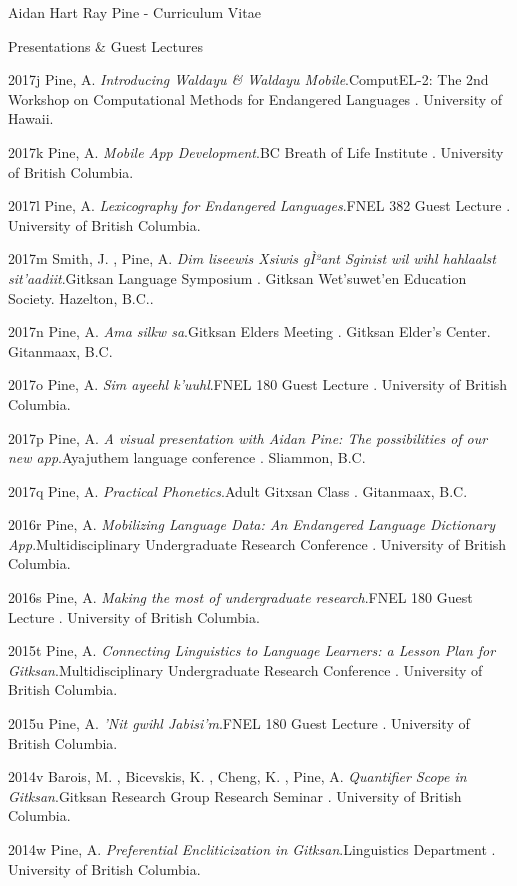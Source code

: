 \documentclass[12pt]{letter}
\begin{document}
\begin{cv}{ Aidan Hart Ray Pine  \space - \space   Curriculum Vitae}
\begin{cvlist}{Presentations \& Guest Lectures}
                    \item[2017j]  Pine,  A.   \textit{Introducing Waldayu \& Waldayu Mobile}.ComputEL-2: The 2nd Workshop on Computational Methods for Endangered Languages . University of Hawaii.  
                    \item[2017k]  Pine,  A.   \textit{Mobile App Development}.BC Breath of Life Institute . University of British Columbia.  
                    \item[2017l]  Pine,  A.   \textit{Lexicography for Endangered Languages}.FNEL 382 Guest Lecture . University of British Columbia.  
                    \item[2017m]  Smith,  J. ,  Pine,  A.   \textit{Dim liseewis Xsiwis gÌ²ant Sginist wil wihl hahlaalst sit'aadiit}.Gitksan Language Symposium . Gitksan Wet'suwet'en Education Society. Hazelton, B.C..  
                    \item[2017n]  Pine,  A.   \textit{Ama silkw sa}.Gitksan Elders Meeting . Gitksan Elder's Center. Gitanmaax, B.C.  
                    \item[2017o]  Pine,  A.   \textit{Sim ayeehl k'uuhl}.FNEL 180 Guest Lecture . University of British Columbia.  
                    \item[2017p]  Pine,  A.   \textit{A visual presentation with Aidan Pine: The possibilities of our new app}.Ayajuthem language conference . Sliammon, B.C.  
                    \item[2017q]  Pine,  A.   \textit{Practical Phonetics}.Adult Gitxsan Class . Gitanmaax, B.C.  
                    \item[2016r]  Pine,  A.   \textit{Mobilizing Language Data: An Endangered Language Dictionary App}.Multidisciplinary Undergraduate Research Conference . University of British Columbia.  
                    \item[2016s]  Pine,  A.   \textit{Making the most of undergraduate research}.FNEL 180 Guest Lecture . University of British Columbia.  
                    \item[2015t]  Pine,  A.   \textit{Connecting Linguistics to Language Learners: a Lesson Plan for Gitksan}.Multidisciplinary Undergraduate Research Conference . University of British Columbia.  
                    \item[2015u]  Pine,  A.   \textit{'Nit gwihl Jabisi'm}.FNEL 180 Guest Lecture . University of British Columbia.  
                    \item[2014v]  Barois,  M. ,  Bicevskis,  K. ,  Cheng,  K. ,  Pine,  A.   \textit{Quantifier Scope in Gitksan}.Gitksan Research Group Research Seminar . University of British Columbia.  
                    \item[2014w]  Pine,  A.   \textit{Preferential Encliticization in Gitksan}.Linguistics Department . University of British Columbia.  
                   

\end{cvlist}
\end{cv}
\end{document}
